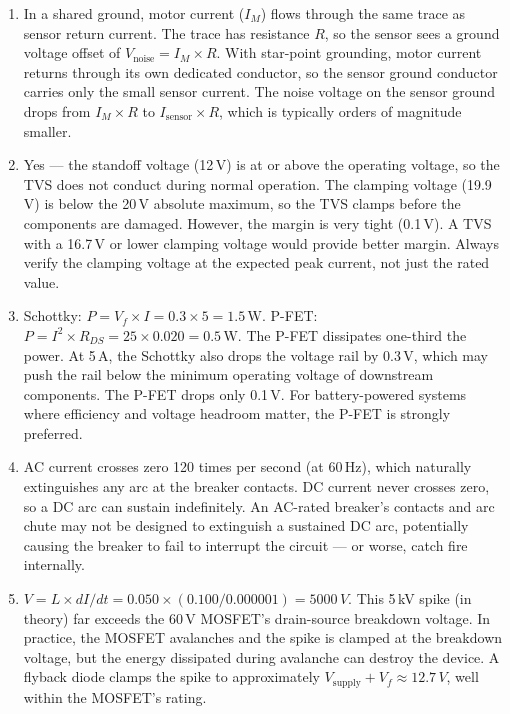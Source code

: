 \documentclass[11pt,letterpaper,twoside,openany]{book}
\begin{document}
\begin{enumerate}[leftmargin=1.5em]
  \item In a shared ground, motor current ($I_M$) flows through the same trace as sensor return current. The trace has resistance $R$, so the sensor sees a ground voltage offset of $V_{\text{noise}} = I_M \times R$. With star-point grounding, motor current returns through its own dedicated conductor, so the sensor ground conductor carries only the small sensor current. The noise voltage on the sensor ground drops from $I_M \times R$ to $I_{\text{sensor}} \times R$, which is typically orders of magnitude smaller.

  \item Yes --- the standoff voltage (12\,V) is at or above the operating voltage, so the TVS does not conduct during normal operation. The clamping voltage (19.9\,V) is below the 20\,V absolute maximum, so the TVS clamps before the components are damaged. However, the margin is very tight (0.1\,V). A TVS with a 16.7\,V or lower clamping voltage would provide better margin. Always verify the clamping voltage at the expected peak current, not just the rated value.

  \item Schottky: $P = V_f \times I = 0.3 \times 5 = 1.5\,\text{W}$. P-FET: $P = I^2 \times R_{DS} = 25 \times 0.020 = 0.5\,\text{W}$. The P-FET dissipates one-third the power. At 5\,A, the Schottky also drops the voltage rail by 0.3\,V, which may push the rail below the minimum operating voltage of downstream components. The P-FET drops only 0.1\,V. For battery-powered systems where efficiency and voltage headroom matter, the P-FET is strongly preferred.

  \item AC current crosses zero 120 times per second (at 60\,Hz), which naturally extinguishes any arc at the breaker contacts. DC current never crosses zero, so a DC arc can sustain indefinitely. An AC-rated breaker's contacts and arc chute may not be designed to extinguish a sustained DC arc, potentially causing the breaker to fail to interrupt the circuit --- or worse, catch fire internally.

  \item $V = L \times dI/dt = 0.050 \times (0.100 / 0.000001) = 5000\,V$. This 5\,kV spike (in theory) far exceeds the 60\,V MOSFET's drain-source breakdown voltage. In practice, the MOSFET avalanches and the spike is clamped at the breakdown voltage, but the energy dissipated during avalanche can destroy the device. A flyback diode clamps the spike to approximately $V_{\text{supply}} + V_f \approx 12.7\,V$, well within the MOSFET's rating.


\end{enumerate}
\end{document}
